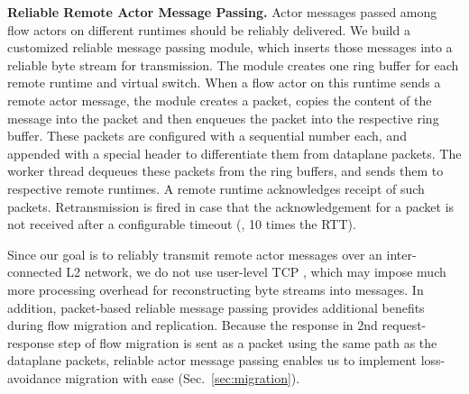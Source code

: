 \vspace{1mm}
\noindent \textbf{Reliable Remote Actor Message Passing.}
Actor messages passed among flow actors on different runtimes should be reliably delivered. We build a customized reliable message passing module, which inserts those messages into a reliable byte stream for transmission. %
The module creates one ring buffer for each remote runtime and virtual switch. When a flow actor on this runtime sends a remote actor message, the module creates a packet, copies the content of the message into the packet and then enqueues the packet into the respective ring buffer. %
These packets are configured with a sequential number each, and appended with a special header to differentiate them from dataplane packets.
The worker thread dequeues these packets from the ring buffers, and sends them to respective remote runtimes. A remote runtime acknowledges receipt of such packets. Retransmission is fired in case that the acknowledgement for a packet is not received after a configurable timeout (\eg, 10 times the RTT).

Since our goal is to reliably transmit remote actor messages over an inter-connected L2 network, we do not use user-level TCP \cite{mtcp} , which may impose much more processing overhead for reconstructing byte streams into messages.
In addition, packet-based reliable message passing provides additional benefits during flow migration and replication. Because the response in 2nd request-response step of flow migration is sent as a packet using the same path as the dataplane packets, reliable actor message passing enables us to implement loss-avoidance migration with ease (Sec.~\ref{sec:migration}).

